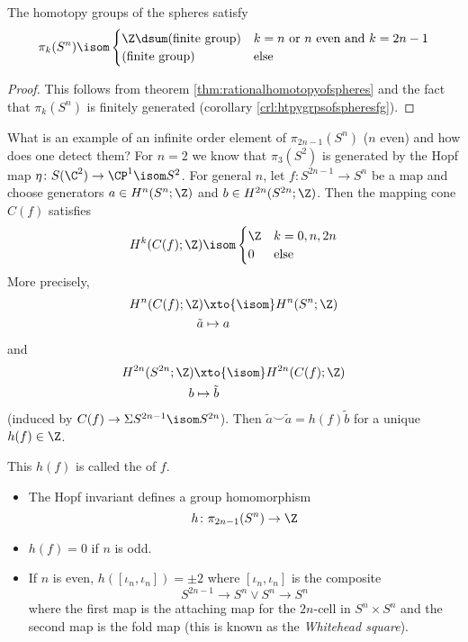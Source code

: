 \begin{corollary}
	The homotopy groups of the spheres satisfy
	\begin{equation*}
		\pi_k(S^n) \isom \begin{cases}
			\Z \dsum \text{(finite group)} 	& k = n \text{ or } n \text{ even and } k = 2n - 1 \\
			\text{(finite group)} 			& \text{else}
		\end{cases}
	\end{equation*}
\end{corollary}
\begin{proof}
	This follows from theorem \ref{thm:rationalhomotopyofspheres} and the fact that $\pi_k(S^n)$ is finitely generated (corollary \ref{crl:htpygrpsofspheresfg}).
\end{proof}
What is an example of an infinite order element of $\pi_{2n - 1}(S^n)$ ($n$ even) and how does one detect them?
For $n = 2$ we know that $\pi_3(S^2)$ is generated by the Hopf map $\eta\colon S(\C^2) \to \CP^1 \isom S^2$.
For general $n$, let $f\colon S^{2n - 1} \to S^n$ be a map and choose generators $a \in H^n(S^n; \Z)$ and $b \in H^{2n}(S^{2n}; \Z)$.
Then the mapping cone $C(f)$ satisfies
\begin{equation*}
	H^k(C(f); \Z) \isom \begin{cases}
		\Z 	& k = 0, n, 2n \\
		0 	& \text{else}
	\end{cases}
\end{equation*}
More precisely,
\begin{align*}
	H^n(C(f); \Z) &\xto{\isom} H^n(S^n; \Z) \\
	\tilde{a} &\mapsto a
\end{align*}
and
\begin{align*}
	H^{2n}(S^{2n}; \Z) &\xto{\isom} H^{2n}(C(f); \Z) \\
	b &\mapsto \tilde{b}
\end{align*}
(induced by $C(f) \to \Sigma S^{2n - 1} \isom S^{2n}$).
Then $\tilde{a} \smile \tilde{a} = h(f) \tilde{b}$ for a unique $h(f) \in \Z$.
\begin{definition}
	This $h(f)$ is called the  of $f$.
\end{definition}
\begin{lemma}
	\leavevmode	
	\begin{itemize}
		\item The Hopf invariant defines a group homomorphism
			\begin{equation*}
				h\colon \pi_{2n - 1}(S^n) \to \Z
			\end{equation*}
		\item $h(f) = 0$ if $n$ is odd.
		\item If $n$ is even, $h([\iota_n, \iota_n]) = \pm 2$ where $[\iota_n, \iota_n]$ is the composite
			\begin{equation*}
				S^{2n - 1} \to S^n \vee S^n \to S^n
			\end{equation*}
			where the first map is the attaching map for the $2n$-cell in $S^n \times S^n$ and the second map is the fold map (this is known as the \emph{Whitehead square}).
	\end{itemize}
\end{lemma}
